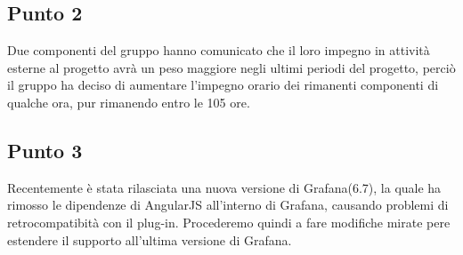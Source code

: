    \subsection{Punto 2}
    Due componenti del gruppo hanno comunicato che il loro impegno in attività esterne al progetto avrà un peso maggiore negli ultimi periodi del progetto, perciò il gruppo ha deciso di aumentare l'impegno orario dei rimanenti componenti di qualche ora, pur rimanendo entro le 105 ore.
    \subsection{Punto 3}
    Recentemente è stata rilasciata una nuova versione di Grafana\glosp (6.7), la quale ha rimosso le dipendenze di AngularJS all'interno di Grafana\glo, causando problemi di retrocompatibità con il plug-in. Procederemo quindi a fare modifiche mirate pere estendere il supporto all'ultima versione di Grafana\glo.
